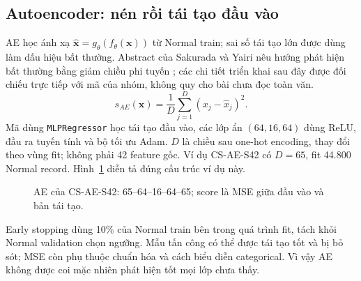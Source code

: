 \subsection{Autoencoder: nén rồi tái tạo đầu vào}
AE học ánh xạ $\hat{\mathbf{x}}=g_\theta(f_\theta(\mathbf{x}))$ từ Normal train; sai số tái tạo lớn được dùng làm dấu hiệu bất thường. Abstract của Sakurada và Yairi nêu hướng phát hiện bất thường bằng giảm chiều phi tuyến \cite{sakurada2014}; các chi tiết triển khai sau đây được đối chiếu trực tiếp với mã của nhóm, không quy cho bài chưa đọc toàn văn.
\begin{equation}
s_{AE}(\mathbf{x})=\frac{1}{D}\sum_{j=1}^{D}(x_j-\hat{x}_j)^2.
\end{equation}
Mã dùng \texttt{MLPRegressor} học tái tạo đầu vào, các lớp ẩn $(64,16,64)$ dùng ReLU, đầu ra tuyến tính và bộ tối ưu Adam. $D$ là chiều sau one-hot encoding, thay đổi theo vùng fit; không phải 42 feature gốc. Ví dụ CS-AE-S42 có $D=65$, fit 44.800 Normal record. Hình~\ref{fig:ae} diễn tả đúng cấu trúc ví dụ này.
\begin{figure}[H]\centering
{}
\caption{AE của CS-AE-S42: 65--64--16--64--65; score là MSE giữa đầu vào và bản tái tạo.}\label{fig:ae}
\end{figure}
Early stopping dùng 10\% của Normal train bên trong quá trình fit, tách khỏi Normal validation chọn ngưỡng. Mẫu tấn công có thể được tái tạo tốt và bị bỏ sót; MSE còn phụ thuộc chuẩn hóa và cách biểu diễn categorical. Vì vậy AE không được coi mặc nhiên phát hiện tốt mọi lớp chưa thấy.
